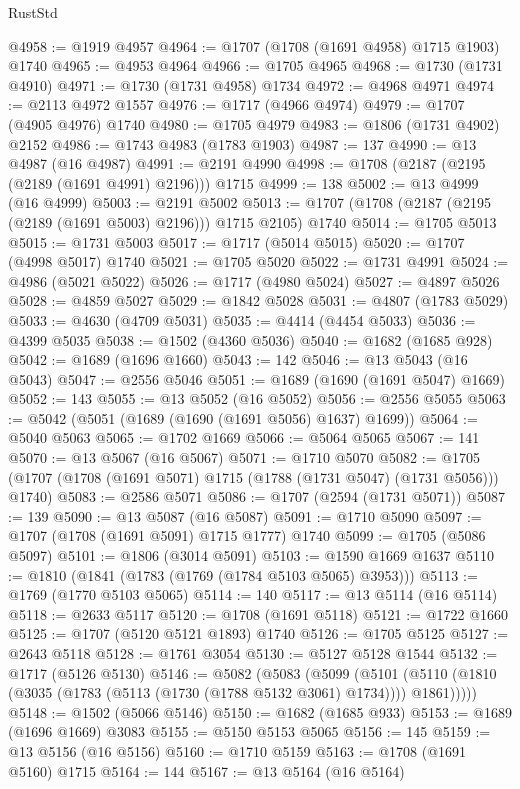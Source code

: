 \begin{lexlean}{RustStd}
\begin{coremodule}
@4958 := @1919 @4957
@4964 := @1707 (@1708 (@1691 @4958) @1715 @1903) @1740
@4965 := @4953 @4964
@4966 := @1705 @4965
@4968 := @1730 (@1731 @4910)
@4971 := @1730 (@1731 @4958) @1734
@4972 := @4968 @4971
@4974 := @2113 @4972 @1557
@4976 := @1717 (@4966 @4974)
@4979 := @1707 (@4905 @4976) @1740
@4980 := @1705 @4979
@4983 := @1806 (@1731 @4902) @2152
@4986 := @1743 @4983 (@1783 @1903)
@4987 := 137
@4990 := @13 @4987 (@16 @4987)
@4991 := @2191 @4990
@4998 := @1708 (@2187 (@2195 (@2189 (@1691 @4991) @2196))) @1715
@4999 := 138
@5002 := @13 @4999 (@16 @4999)
@5003 := @2191 @5002
@5013 := @1707 (@1708 (@2187 (@2195 (@2189 (@1691 @5003) @2196))) @1715 @2105) @1740
@5014 := @1705 @5013
@5015 := @1731 @5003
@5017 := @1717 (@5014 @5015)
@5020 := @1707 (@4998 @5017) @1740
@5021 := @1705 @5020
@5022 := @1731 @4991
@5024 := @4986 (@5021 @5022)
@5026 := @1717 (@4980 @5024)
@5027 := @4897 @5026
@5028 := @4859 @5027
@5029 := @1842 @5028
@5031 := @4807 (@1783 @5029)
@5033 := @4630 (@4709 @5031)
@5035 := @4414 (@4454 @5033)
@5036 := @4399 @5035
@5038 := @1502 (@4360 @5036)
@5040 := @1682 (@1685 @928)
@5042 := @1689 (@1696 @1660)
@5043 := 142
@5046 := @13 @5043 (@16 @5043)
@5047 := @2556 @5046
@5051 := @1689 (@1690 (@1691 @5047) @1669)
@5052 := 143
@5055 := @13 @5052 (@16 @5052)
@5056 := @2556 @5055
@5063 := @5042 (@5051 (@1689 (@1690 (@1691 @5056) @1637) @1699))
@5064 := @5040 @5063
@5065 := @1702 @1669
@5066 := @5064 @5065
@5067 := 141
@5070 := @13 @5067 (@16 @5067)
@5071 := @1710 @5070
@5082 := @1705 (@1707 (@1708 (@1691 @5071) @1715 (@1788 (@1731 @5047) (@1731 @5056))) @1740)
@5083 := @2586 @5071
@5086 := @1707 (@2594 (@1731 @5071))
@5087 := 139
@5090 := @13 @5087 (@16 @5087)
@5091 := @1710 @5090
@5097 := @1707 (@1708 (@1691 @5091) @1715 @1777) @1740
@5099 := @1705 (@5086 @5097)
@5101 := @1806 (@3014 @5091)
@5103 := @1590 @1669 @1637
@5110 := @1810 (@1841 (@1783 (@1769 (@1784 @5103 @5065) @3953)))
@5113 := @1769 (@1770 @5103 @5065)
@5114 := 140
@5117 := @13 @5114 (@16 @5114)
@5118 := @2633 @5117
@5120 := @1708 (@1691 @5118)
@5121 := @1722 @1660
@5125 := @1707 (@5120 @5121 @1893) @1740
@5126 := @1705 @5125
@5127 := @2643 @5118
@5128 := @1761 @3054
@5130 := @5127 @5128 @1544
@5132 := @1717 (@5126 @5130)
@5146 := @5082
    (@5083
      (@5099
        (@5101 (@5110 (@1810 (@3035 (@1783 (@5113 (@1730 (@1788 @5132 @3061) @1734)))) @1861)))))
@5148 := @1502 (@5066 @5146)
@5150 := @1682 (@1685 @933)
@5153 := @1689 (@1696 @1669) @3083
@5155 := @5150 @5153 @5065
@5156 := 145
@5159 := @13 @5156 (@16 @5156)
@5160 := @1710 @5159
@5163 := @1708 (@1691 @5160) @1715
@5164 := 144
@5167 := @13 @5164 (@16 @5164)

\end{coremodule}
\end{lexlean}
